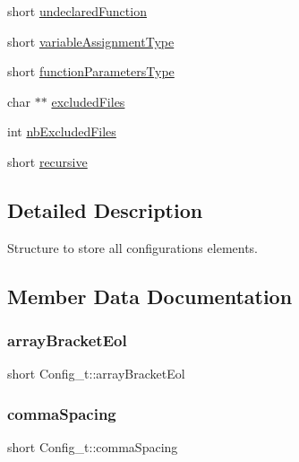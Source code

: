 \begin{DoxyCompactItemize}
\item 
short \hyperlink{structConfig__t_ae10b1d04c6d0762fbcb7b4406d888a5d}{undeclared\+Function}
\item 
short \hyperlink{structConfig__t_abed8ad04a1696c089ba4ce283743c67e}{variable\+Assignment\+Type}
\item 
short \hyperlink{structConfig__t_ac839f0c65179233fc86b731cac821023}{function\+Parameters\+Type}
\item 
char $\ast$$\ast$ \hyperlink{structConfig__t_a63665db6545b70d0c856041075352f6f}{excluded\+Files}
\item 
int \hyperlink{structConfig__t_ab97fb08912a0271b7b4623a75c6b1fda}{nb\+Excluded\+Files}
\item 
short \hyperlink{structConfig__t_a983242633069db53f8ce1852ee8eabfc}{recursive}
\end{DoxyCompactItemize}


\subsection{Detailed Description}
Structure to store all configurations elements. 

\subsection{Member Data Documentation}
\mbox{\label{structConfig__t_a638fad6042df80f4ddef34593654dd9d}} 
\subsubsection{\texorpdfstring{array\+Bracket\+Eol}{arrayBracketEol}}
{\footnotesize\ttfamily short Config\+\_\+t\+::array\+Bracket\+Eol}

\mbox{\label{structConfig__t_a65d13a772c2b16fdcf47404c4eca2c70}} 
\subsubsection{\texorpdfstring{comma\+Spacing}{commaSpacing}}
{\footnotesize\ttfamily short Config\+\_\+t\+::comma\+Spacing}

